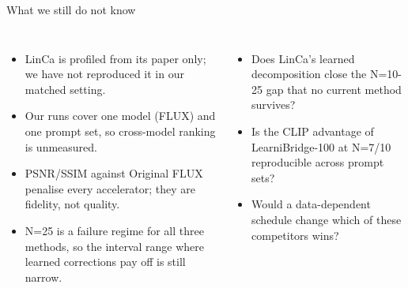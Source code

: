 \begin{frame}{What we still do not know}
\begin{columns}[T]
\begin{itemize}
  \item LinCa is profiled from its paper only; we have not reproduced it in our matched setting.
  \item Our runs cover one model (FLUX) and one prompt set, so cross-model ranking is unmeasured.
  \item PSNR/SSIM against Original FLUX penalise every accelerator; they are fidelity, not quality.
  \item N=25 is a failure regime for all three methods, so the interval range where learned corrections pay off is still narrow.
\end{itemize}
\begin{itemize}
  \item Does LinCa's learned decomposition close the N=10-25 gap that no current method survives?
  \item Is the CLIP advantage of LearniBridge-100 at N=7/10 reproducible across prompt sets?
  \item Would a data-dependent schedule change which of these competitors wins?
\end{itemize}
\end{columns}
\end{frame}
